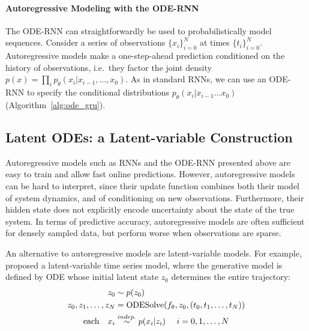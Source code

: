 \documentclass{article}
\begin{document}
\paragraph{Autoregressive Modeling with the ODE-RNN}
The ODE-RNN can straightforwardly be used to probabilistically model sequences.
Consider a series of observations $\{x_i\}_{i = 0}^N$ at times $\{t_i\}_{i = 0}^N$. Autoregressive models make a one-step-ahead prediction conditioned on the history of observations, i.e.\ they factor the joint density $p(x) = \prod_i p_\theta(x_i|x_{i-1}, \dots, x_0)$.
As in standard RNNs, we can use an ODE-RNN to specify the conditional distributions $p_\theta(x_i|x_{i-1}...x_0)$ (Algorithm~\ref{alg:ode_gru}).



\subsection{Latent ODEs: a Latent-variable Construction}



Autoregressive models such as RNNs and the ODE-RNN presented above are easy to train and allow fast online predictions.
However, autoregressive models can be hard to interpret, since their update function combines both their model of system dynamics, and of conditioning on new observations.
Furthermore, their hidden state does not explicitly encode uncertainty about the state of the true system.
In terms of predictive accuracy, autoregressive models are often sufficient for densely sampled data, but perform worse when observations are sparse.

An alternative to autoregressive models are latent-variable models.
For example, \citet{NeuralODE} proposed a latent-variable time series model, where the generative model is defined by ODE whose initial latent state $z_0$ determines the entire trajectory:
\begin{align}
 z_0 & \sim p(z_0) \\
 z_0, z_1, \dots,z_N & = \text{ODESolve}(f_\theta, z_0, (t_0, t_1, \dots,t_N)) \\
 \textnormal{each} \quad {x}_{i} & \stackrel{\footnotesize{indep.}}{\sim} p(x_i | z_{i}) \quad \  i=0, 1, \dots, N
 \label{eq:gen_ode}
\end{align}
\end{document}

